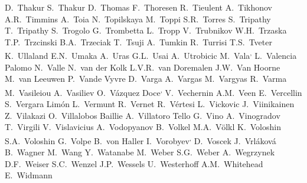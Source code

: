 \begin{flushleft}
D.~Thakur\And 
S.~Thakur\And 
D.~Thomas\And 
F.~Thoresen\And 
R.~Tieulent\And 
A.~Tikhonov\And 
A.R.~Timmins\And 
A.~Toia\And 
N.~Topilskaya\And 
M.~Toppi\And 
S.R.~Torres\And 
S.~Tripathy\And 
T.~Tripathy\And 
S.~Trogolo\And 
G.~Trombetta\And 
L.~Tropp\And 
V.~Trubnikov\And 
W.H.~Trzaska\And 
T.P.~Trzcinski\And 
B.A.~Trzeciak\And 
T.~Tsuji\And 
A.~Tumkin\And 
R.~Turrisi\And 
T.S.~Tveter\And 
K.~Ullaland\And 
E.N.~Umaka\And 
A.~Uras\And 
G.L.~Usai\And 
A.~Utrobicic\And 
M.~Vala\textsuperscript{,}\And 
L.~Valencia Palomo\And 
N.~Valle\And 
N.~van der Kolk\And 
L.V.R.~van Doremalen\And 
J.W.~Van Hoorne\And 
M.~van Leeuwen\And 
P.~Vande Vyvre\And 
D.~Varga\And 
A.~Vargas\And 
M.~Vargyas\And 
R.~Varma\And 
M.~Vasileiou\And 
A.~Vasiliev\And 
O.~V\'azquez Doce\textsuperscript{,}\And 
V.~Vechernin\And 
A.M.~Veen\And 
E.~Vercellin\And 
S.~Vergara Lim\'on\And 
L.~Vermunt\And 
R.~Vernet\And 
R.~V\'ertesi\And 
L.~Vickovic\And 
J.~Viinikainen\And 
Z.~Vilakazi\And 
O.~Villalobos Baillie\And 
A.~Villatoro Tello\And 
G.~Vino\And 
A.~Vinogradov\And 
T.~Virgili\And 
V.~Vislavicius\And 
A.~Vodopyanov\And 
B.~Volkel\And 
M.A.~V\"{o}lkl\And 
K.~Voloshin\And 
S.A.~Voloshin\And 
G.~Volpe\And 
B.~von Haller\And 
I.~Vorobyev\textsuperscript{,}\And 
D.~Voscek\And 
J.~Vrl\'{a}kov\'{a}\And 
B.~Wagner\And 
M.~Wang\And 
Y.~Watanabe\And 
M.~Weber\And 
S.G.~Weber\And 
A.~Wegrzynek\And 
D.F.~Weiser\And 
S.C.~Wenzel\And 
J.P.~Wessels\And 
U.~Westerhoff\And 
A.M.~Whitehead\And 
E.~Widmann\And 

\end{flushleft}
